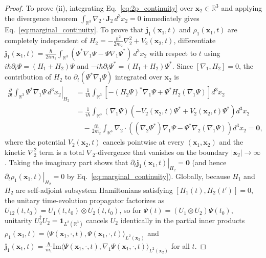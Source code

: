 \documentclass[11pt, a4paper]{article}
\theoremstyle{definition}
\begin{document}
\begin{proof}
To prove (ii), integrating Eq.~\eqref{eq:2p_continuity} over $\mathbf{x}_2 \in \mathbb{R}^3$ and applying the divergence theorem $\int_{\mathbb{R}^3} \nabla_2 \cdot \mathbf{J}_2\,d^3x_2 = 0$ immediately gives Eq.~\eqref{eq:marginal_continuity}. To prove that $\mathbf{j}_1(\mathbf{x}_1, t)$ and $\rho_1(\mathbf{x}_1, t)$ are completely independent of $H_2 = -\frac{\hbar^2}{2m_2}\nabla_2^2 + V_2(\mathbf{x}_2, t)$, differentiate $\mathbf{j}_1(\mathbf{x}_1, t) = \frac{\hbar}{2im_1}\int_{\mathbb{R}^3}(\Psi^*\nabla_1\Psi - \Psi\nabla_1\Psi^*)\,d^3x_2$ with respect to $t$ using $i\hbar\partial_t \Psi = (H_1 + H_2)\Psi$ and $-i\hbar\partial_t \Psi^* = (H_1 + H_2)\Psi^*$. Since $[\nabla_1, H_2] = 0$, the contribution of $H_2$ to $\partial_t (\Psi^* \nabla_1 \Psi)$ integrated over $\mathbf{x}_2$ is
\begin{align}
\left.\frac{\partial}{\partial t}\int_{\mathbb{R}^3} \Psi^* \nabla_1 \Psi \, d^3x_2 \right|_{H_2} &= \frac{1}{i\hbar}\int_{\mathbb{R}^3} \left[ -(H_2 \Psi)^* \nabla_1 \Psi + \Psi^* H_2 (\nabla_1 \Psi) \right] d^3x_2 \nonumber \\
&= \frac{1}{i\hbar}\int_{\mathbb{R}^3} (\nabla_1 \Psi)\left( -V_2(\mathbf{x}_2, t)\Psi^* + V_2(\mathbf{x}_2, t)\Psi^* \right) d^3x_2 \nonumber \\
&\quad - \frac{i\hbar}{2m_2}\int_{\mathbb{R}^3} \nabla_2 \cdot \left( (\nabla_2 \Psi^*)\nabla_1 \Psi - \Psi^* \nabla_2(\nabla_1 \Psi) \right) d^3x_2 = \mathbf{0},
\end{align}
where the potential $V_2(\mathbf{x}_2, t)$ cancels pointwise at every $(\mathbf{x}_1, \mathbf{x}_2)$ and the kinetic $\nabla_2^2$ term is a total $\nabla_2$-divergence that vanishes on the boundary $|\mathbf{x}_2| \to \infty$. Taking the imaginary part shows that $\left.\partial_t \mathbf{j}_1(\mathbf{x}_1, t)\right|_{H_2} = \mathbf{0}$ (and hence $\left.\partial_t \rho_1(\mathbf{x}_1, t)\right|_{H_2} = 0$ by Eq.~\eqref{eq:marginal_continuity}). Globally, because $H_1$ and $H_2$ are self-adjoint subsystem Hamiltonians satisfying $[H_1(t), H_2(t')] = 0$, the unitary time-evolution propagator factorizes as $U_{12}(t, t_0) = U_1(t, t_0) \otimes U_2(t, t_0)$, so for $\Psi(t) = (U_1 \otimes U_2)\Psi(t_0)$, unitarity $U_2^\dagger U_2 = \mathbf{1}_{L^2(\mathbb{R}^3)}$ cancels $U_2$ identically in the partial inner products $\rho_1(\mathbf{x}_1, t) = \langle \Psi(\mathbf{x}_1, \cdot, t), \Psi(\mathbf{x}_1, \cdot, t) \rangle_{L^2(\mathbf{x}_2)}$ and $\mathbf{j}_1(\mathbf{x}_1, t) = \frac{\hbar}{m_1}\text{Im}\langle \Psi(\mathbf{x}_1, \cdot, t), \nabla_1 \Psi(\mathbf{x}_1, \cdot, t) \rangle_{L^2(\mathbf{x}_2)}$ for all $t$.
\end{proof}
\end{document}
